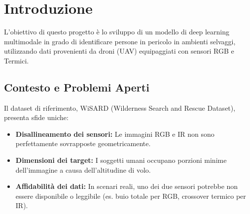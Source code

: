 \documentclass[a4paper,12pt]{article}
\begin{document}
\thispagestyle{plain}
\begin{abstract}
    Le operazioni di ricerca e soccorso (SAR) in ambienti ostili richiedono sistemi di visione artificiale robusti, capaci di operare sia nello spettro visibile (RGB) che in quello termico (IR). Tuttavia, l'addestramento su dati multimodali spesso porta a una forte dipendenza dalla presenza simultanea di entrambi i sensori, causando un drastico calo delle prestazioni qualora uno dei due non fosse disponibile. Questo report analizza l'efficacia della tecnica di \textit{Modal Dropout} applicata ad architetture Transformer-based (DETR) per mitigare tale problema. Successivamente, la ricerca si focalizza sull'ottimizzazione per l'inferenza in tempo reale, proponendo l'adozione dell'architettura \textbf{RT-DETR}. Vengono confrontate diverse strategie di fusione (Additive vs CMX) e tecniche di gestione della scala (Tiling). I risultati dimostrano che l'uso del Modal Dropout, combinato con RT-DETR e fusione additiva, offre il miglior compromesso tra robustezza operativa e velocità di inferenza, ponendo le basi per futuri sviluppi legati all'allineamento geometrico delle feature.
\end{abstract}

\newpage

\section{Introduzione}

L'obiettivo di questo progetto è lo sviluppo di un modello di deep learning multimodale in grado di identificare persone in pericolo in ambienti selvaggi, utilizzando dati provenienti da droni (UAV) equipaggiati con sensori RGB e Termici.

\subsection{Contesto e Problemi Aperti}
Il dataset di riferimento, WiSARD (Wilderness Search and Rescue Dataset), presenta sfide uniche:
\begin{itemize}
    \item \textbf{Disallineamento dei sensori:} Le immagini RGB e IR non sono perfettamente sovrapposte geometricamente.
    \item \textbf{Dimensioni dei target:} I soggetti umani occupano porzioni minime dell'immagine a causa dell'altitudine di volo.
    \item \textbf{Affidabilità dei dati:} In scenari reali, uno dei due sensori potrebbe non essere disponibile o leggibile (es. buio totale per RGB, crossover termico per IR).
\end{itemize}
\end{document}
